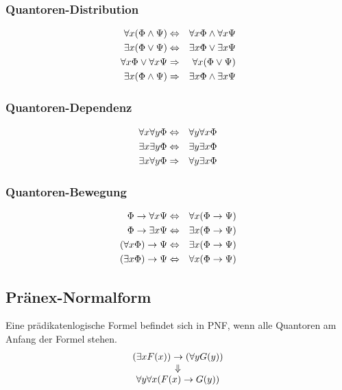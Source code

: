 \documentclass[a4paper]{scrartcl}
\begin{document}
\subsubsection{Quantoren-Distribution}
\begin{eqnarray*}
	\forall x (\Phi \wedge \Psi)       & \Leftrightarrow   & \forall x \Phi \wedge \forall x \Psi \\
	\exists x (\Phi \vee \Psi)         & \Leftrightarrow   & \exists x \Phi \vee \exists x \Psi \\
	\forall x \Phi \vee \forall x \Psi & \Rightarrow & \forall x (\Phi \vee \Psi) \\
	\exists x (\Phi \wedge \Psi)       & \Rightarrow & \exists x \Phi \wedge \exists x \Psi
\end{eqnarray*}

\subsubsection{Quantoren-Dependenz}
\begin{eqnarray*}
	\forall x \forall y \Phi & \Leftrightarrow   & \forall y \forall x \Phi \\
	\exists x \exists y \Phi & \Leftrightarrow   & \exists y \exists x \Phi \\
	\exists x \forall y \Phi & \Rightarrow & \forall y \exists x \Phi 
\end{eqnarray*}

\subsubsection{Quantoren-Bewegung}
\begin{eqnarray*}
	\Phi \rightarrow \forall x \Psi & \Leftrightarrow & \forall x (\Phi \rightarrow \Psi) \\
	\Phi \rightarrow \exists x \Psi & \Leftrightarrow & \exists x (\Phi \rightarrow \Psi) \\
	(\forall x \Phi) \rightarrow \Psi & \Leftrightarrow & \exists x (\Phi \rightarrow \Psi) \\
	(\exists x \Phi) \rightarrow \Psi & \Leftrightarrow & \forall x (\Phi \rightarrow \Psi) 
\end{eqnarray*}

\subsection{Pränex-Normalform}
Eine prädikatenlogische Formel befindet sich in PNF, wenn alle Quantoren am Anfang der Formel stehen.
$$\begin{array}{c}
	(\exists x F(x)) \rightarrow (\forall y G(y)) \\
	\Downarrow\\
	\forall y \forall x (F(x) \rightarrow G(y))
\end{array}$$
\end{document}
